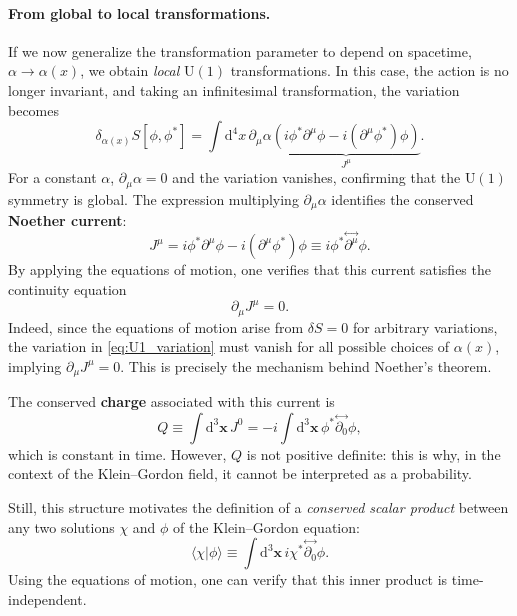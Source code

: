 \paragraph{From global to local transformations.}
If we now generalize the transformation parameter to depend on spacetime, \(\alpha \to \alpha(x)\), we obtain \textit{local} \(\mathrm{U}(1)\) transformations.
In this case, the action is no longer invariant, and taking an infinitesimal transformation, the variation becomes
\begin{equation}
    \delta_{\alpha(x)} S[\phi, \phi^{\ast}] =
    \int \mathrm{d}^4 x \, \partial_{\mu}\alpha
    \underbrace{
        \left(
        i\phi^{\ast}\partial^{\mu}\phi
        - i(\partial^{\mu}\phi^{\ast})\phi
        \right)
    }_{J^{\mu}}.
    \label{eq:U1_variation}
\end{equation}
For a constant \(\alpha\), \(\partial_{\mu}\alpha = 0\) and the variation vanishes, confirming that the \(\mathrm{U}(1)\) symmetry is global.
The expression multiplying \(\partial_{\mu}\alpha\) identifies the conserved \textbf{Noether current}:
\begin{equation}
    J^{\mu} = i\phi^{\ast}\partial^{\mu}\phi - i(\partial^{\mu}\phi^{\ast})\phi
    \equiv i\phi^{\ast}\!\stackrel{\leftrightarrow}{\partial^{\mu}}\!\phi.
    \label{eq:U1_Noether_current}
\end{equation}
By applying the equations of motion, one verifies that this current satisfies the continuity equation
\[
    \partial_{\mu}J^{\mu} = 0.
\]
Indeed, since the equations of motion arise from \(\delta S = 0\) for arbitrary variations, the variation in \eqref{eq:U1_variation} must vanish for all possible choices of \(\alpha(x)\), implying \(\partial_{\mu}J^{\mu} = 0\).
This is precisely the mechanism behind Noether’s theorem.

The conserved \textbf{charge} associated with this current is
\begin{equation}
    Q \equiv \int \mathrm{d}^3 \mathbf{x} \, J^0
    = -i \int \mathrm{d}^3 \mathbf{x} \, \phi^{\ast}
    \!\stackrel{\leftrightarrow}{\partial_0}\!\phi,
    \label{eq:U1_Noether_charge}
\end{equation}
which is constant in time.
However, \(Q\) is not positive definite: this is why, in the context of the Klein--Gordon field, it cannot be interpreted as a probability.

Still, this structure motivates the definition of a \textit{conserved scalar product} between any two solutions \(\chi\) and \(\phi\) of the Klein--Gordon equation:
\[
    \langle \chi | \phi \rangle
    \equiv \int \mathrm{d}^3 \mathbf{x} \, i \chi^{\ast}
    \!\stackrel{\leftrightarrow}{\partial_0}\!\phi.
\]
Using the equations of motion, one can verify that this inner product is time-independent.

